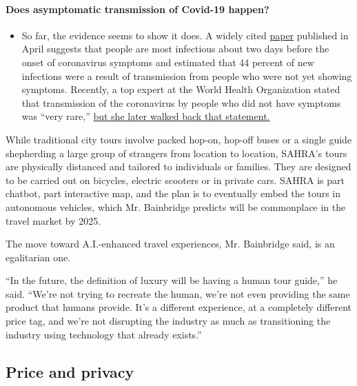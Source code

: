 \begin{itemize}
{  \paragraph{Does asymptomatic transmission of Covid-19
  happen?}\label{does-asymptomatic-transmission-of-covid-19-happen}}

  \begin{itemize}
  \tightlist
  \item
    So far, the evidence seems to show it does. A widely cited
    \href{https://www.nature.com/articles/s41591-020-0869-5}{paper}
    published in April suggests that people are most infectious about
    two days before the onset of coronavirus symptoms and estimated that
    44 percent of new infections were a result of transmission from
    people who were not yet showing symptoms. Recently, a top expert at
    the World Health Organization stated that transmission of the
    coronavirus by people who did not have symptoms was ``very rare,''
    \href{https://www.nytimes3xbfgragh.onion/2020/06/09/world/coronavirus-updates.html?action=click\&pgtype=Article\&state=default\&region=MAIN_CONTENT_3\&context=storylines_faq\#link-1f302e21}{but
    she later walked back that statement.}
  \end{itemize}
\end{itemize}

While traditional city tours involve packed hop-on, hop-off buses or a
single guide shepherding a large group of strangers from location to
location, SAHRA's tours are physically distanced and tailored to
individuals or families. They are designed to be carried out on
bicycles, electric scooters or in private cars. SAHRA is part chatbot,
part interactive map, and the plan is to eventually embed the tours in
autonomous vehicles, which Mr. Bainbridge predicts will be commonplace
in the travel market by 2025.

The move toward A.I.-enhanced travel experiences, Mr. Bainbridge said,
is an egalitarian one.

``In the future, the definition of luxury will be having a human tour
guide,'' he said. ``We're not trying to recreate the human, we're not
even providing the same product that humans provide. It's a different
experience, at a completely different price tag, and we're not
disrupting the industry as much as transitioning the industry using
technology that already exists.''

\hypertarget{price-and-privacy}{%
\subsection{Price and privacy}\label{price-and-privacy}}

